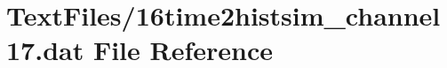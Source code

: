 \hypertarget{16time2histsim__channel17_8dat}{}\section{Text\+Files/16time2histsim\+\_\+channel17.dat File Reference}
\label{16time2histsim__channel17_8dat}
